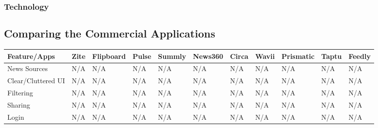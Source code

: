 \subsubsection{Technology}


\subsection{Comparing the Commercial Applications}

\begin{center}
    \begin{tabular}{ | l | l | l | l | l | l | l | l | l | l | l |}
    \hline
    Feature/Apps & Zite & Flipboard & Pulse & Summly & News360 & Circa & Wavii & Prismatic & Taptu & Feedly \\ \hline
     
    News Sources & N/A & N/A & N/A & N/A & N/A & N/A & N/A & N/A & N/A & N/A  \\ \hline
     
    Clear/Cluttered UI & N/A & N/A & N/A & N/A & N/A & N/A & N/A & N/A & N/A & N/A  \\ \hline
     
    Filtering & N/A & N/A & N/A & N/A & N/A & N/A & N/A & N/A & N/A & N/A  \\ \hline

    Sharing & N/A & N/A & N/A & N/A & N/A & N/A & N/A & N/A & N/A & N/A  \\ \hline

    Login & N/A & N/A & N/A & N/A & N/A & N/A & N/A & N/A & N/A & N/A  \\ \hline
    \end{tabular}
\end{center}

